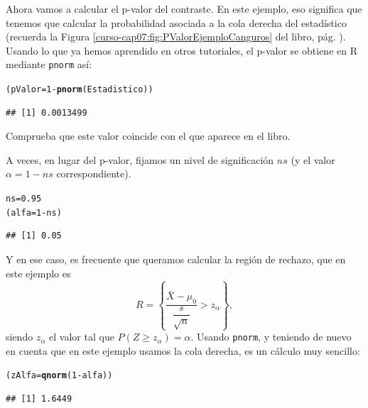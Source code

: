 \documentclass[10pt,a4paper]{article}\usepackage[]{graphicx}\usepackage[]{color}
\makeatletter
\newcommand{\hlnum}[1]{\textcolor[rgb]{0.686,0.059,0.569}{#1}}%
\newcommand{\hlopt}[1]{\textcolor[rgb]{0,0,0}{#1}}%
\newcommand{\hlstd}[1]{\textcolor[rgb]{0.345,0.345,0.345}{#1}}%
\newcommand{\hlkwb}[1]{\textcolor[rgb]{0.69,0.353,0.396}{#1}}%
\newcommand{\hlkwd}[1]{\textcolor[rgb]{0.737,0.353,0.396}{\textbf{#1}}}%
\newenvironment{kframe}{%
 \def\at@end@of@kframe{}%
 \ifinner\ifhmode%
  \def\at@end@of@kframe{\end{minipage}}%
  \begin{minipage}{\columnwidth}%
 \fi\fi%
 \def\FrameCommand##1{\hskip\@totalleftmargin \hskip-\fboxsep
 \colorbox{shadecolor}{##1}\hskip-\fboxsep
     \hskip-\linewidth \hskip-\@totalleftmargin \hskip\columnwidth}%
 \MakeFramed {\advance\hsize-\width
   \@totalleftmargin\z@ \linewidth\hsize
   \@setminipage}}%
 {\par\unskip\endMakeFramed%
 \at@end@of@kframe}
\newenvironment{knitrout}{}{} %
\newcounter {cont01}
\makeatother
\begin{document}
Ahora vamos a calcular el p-valor del contraste. En este ejemplo, eso significa que tenemos que calcular la probabilidad asociada a la cola derecha del estadístico (recuerda la Figura \ref{curso-cap07:fig:PValorEjemploCanguros} del libro, pág. \pageref{curso-cap07:fig:PValorEjemploCanguros}). Usando lo que ya hemos aprendido en otros tutoriales, el p-valor se obtiene en R mediante {\tt pnorm} así:
\begin{knitrout}
\color{fgcolor}\begin{kframe}
\begin{alltt}
\hlstd{(pValor} \hlkwb{=} \hlnum{1} \hlopt{-} \hlkwd{pnorm}\hlstd{(Estadistico))}
\end{alltt}
\begin{verbatim}
## [1] 0.0013499
\end{verbatim}
\end{kframe}
\end{knitrout}
Comprueba que este valor coincide con el que aparece en el libro.

A veces, en lugar del p-valor, fijamos un nivel de significación $ns$ (y el valor $\alpha = 1- ns$ correspondiente).
\begin{knitrout}
\color{fgcolor}\begin{kframe}
\begin{alltt}
\hlstd{ns} \hlkwb{=} \hlnum{0.95}
\hlstd{(alfa} \hlkwb{=} \hlnum{1}\hlopt{-} \hlstd{ns)}
\end{alltt}
\begin{verbatim}
## [1] 0.05
\end{verbatim}
\end{kframe}
\end{knitrout}
Y en ese caso, es frecuente que queramos calcular la región de rechazo, que en este ejemplo es
\[R=\left\{\dfrac{\bar X-\mu_0}{\dfrac{s}{\sqrt{n}}} > z_{\alpha}\right\},\]
siendo $z_{\alpha}$ el valor tal que $P(Z\geq z_{\alpha})=\alpha$. Usando {\tt pnorm}, y teniendo de nuevo en cuenta que en este ejemplo usamos la cola derecha, es un cálculo muy sencillo:
\begin{knitrout}
\color{fgcolor}\begin{kframe}
\begin{alltt}
\hlstd{(zAlfa} \hlkwb{=} \hlkwd{qnorm}\hlstd{(}\hlnum{1}\hlopt{-} \hlstd{alfa))}
\end{alltt}
\begin{verbatim}
## [1] 1.6449
\end{verbatim}
\end{kframe}
\end{knitrout}
\end{document}
